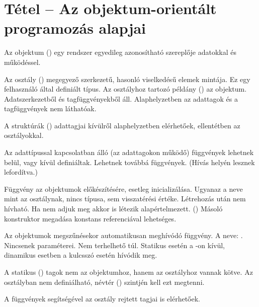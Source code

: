 \documentclass[main.tex]{subfiles}
\begin{document}
  \section{Tétel – Az objektum-orientált programozás alapjai} %

  Az objektum () egy rendszer egyedileg
  azonosítható szereplője adatokkal és működéssel.
  

  Az osztály () megegyező szerkezetű,
  hasonló viselkedésű elemek mintája.
  Ez egy felhasználó által definiált típus.
  Az osztályhoz tartozó példány () az objektum.
  Adatszerkezetből és tagfüggvényekből áll.
  Alaphelyzetben az adattagok és a tagfüggvények
  nem láthatóak.


  A struktúrák () adattagjai kívülről
  alaphelyzetben elérhetőek, ellentétben az osztályokkal.


  Az adattípussal kapcsolatban álló (az adattagokon működő)
  függvények lehetnek belül, vagy kívül definiáltak.
  Lehetnek továbbá  függvények.
  (Hívás helyén lesznek lefordítva.)


  Függvény az objektumok előkészítésére, esetleg inicializálása.
  Ugyanaz a neve mint az osztálynak, nincs típusa,
  sem visszatérési értéke. Létrehozás után nem hívható.
  Ha nem adjuk meg akkor is létezik alapértelmezett. ()
  Másoló konstruktor megadása konstans referenciával lehetséges.


  Az objektumok megszűnésekor automatikusan meghívódó függvény.
  A neve: . Nincsenek paraméterei.
  Nem terhelhető túl. Statikus  esetén a
  -on kívül, dinamikus esetben a 
  kulcsszó esetén hívódik meg.


  A statikus () tagok nem az objektumhoz,
  hanem az osztályhoz vannak kötve. Az osztályban nem definiálható,
  névtér () szintjén kell ezt megtenni.


  A  függvények segítségével az osztály rejtett tagjai
  is elérhetőek.
\end{document}

